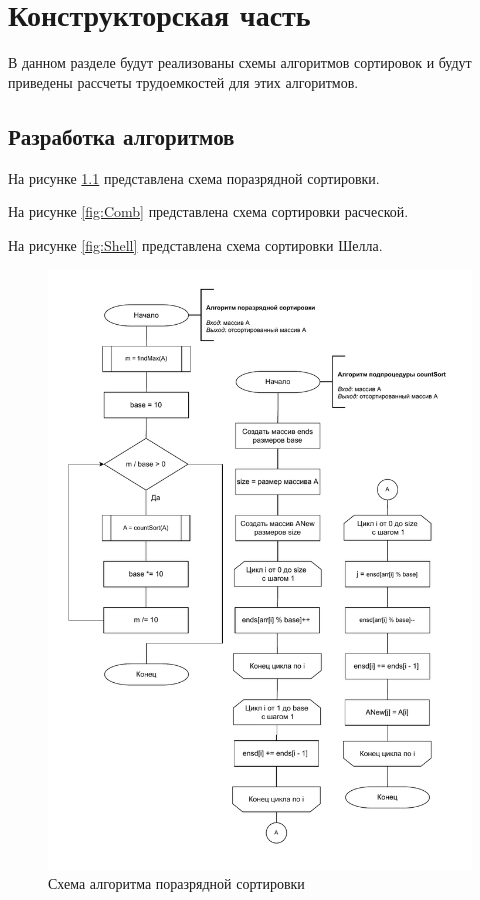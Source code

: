 \chapter{Конструкторская часть}
В данном разделе будут реализованы схемы алгоритмов сортировок и будут приведены рассчеты трудоемкостей для этих алгоритмов.

\section{Разработка алгоритмов}
На рисунке \ref{fig:Radix} представлена схема поразрядной сортировки.

На рисунке \ref{fig:Comb} представлена схема сортировки расческой.

На рисунке \ref{fig:Shell} представлена схема сортировки Шелла.

\begin{figure}[h]
	\centering
	\includegraphics[height=0.9\textheight, page=1]{img/algorithms.pdf}
	\caption{Схема алгоритма поразрядной сортировки}
	\label{fig:Radix}
\end{figure}

